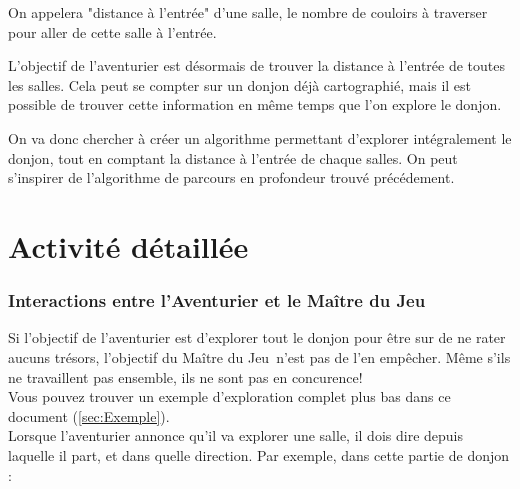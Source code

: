 \documentclass{article}
\newcommand{\mj}{Maître du Jeu}
\begin{document}
        On appelera "distance à l'entrée" d'une salle, le nombre de couloirs à traverser pour aller de cette salle à l'entrée.

        L'objectif de l'aventurier est désormais de trouver la distance à l'entrée de toutes les salles. Cela peut se compter sur un donjon déjà cartographié, mais il est possible de trouver cette information en même temps que l'on explore le donjon.

        On va donc chercher à créer un algorithme permettant d'explorer intégralement le donjon, tout en comptant la distance à l'entrée de chaque salles. On peut s'inspirer de l'algorithme de parcours en profondeur trouvé précédement.

\newpage
\part{Activité détaillée}
    \section{Interactions entre l'Aventurier et le \mj}
        Si l'objectif de l'aventurier est d'explorer tout le donjon pour être sur de ne rater aucuns trésors, l'objectif du \mj\ n'est pas de l'en empêcher. Même s'ils ne travaillent pas ensemble, ils ne sont pas en concurence!\\
        Vous pouvez trouver un exemple d'exploration complet plus bas dans ce document (\autoref{sec:Exemple}).\\

        Lorsque l'aventurier annonce qu'il va explorer une salle, il dois dire depuis laquelle il part, et dans quelle direction. Par exemple, dans cette partie de donjon :\bigskip

        \noindent {}
\end{document}
